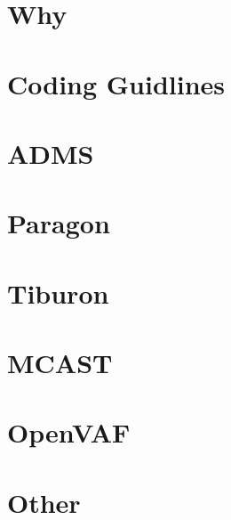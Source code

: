 \documentclass{article}[11pt]
\begin{document}
\notetitle

\section{Why}

\cite{kundert-automodcomp-02}
\cite{chalkiadaki-veriloga-13}


\section{Coding Guidlines}
\cite{fitzpatrick-veriloga-98}
\cite{coram-verilogamodel-04}
\cite{mcandrew-veriloga-15}

\section{ADMS}

\cite{lemaitre-adms-02}

\section{Paragon}
\cite{chaudhary-adms-04}

\section{Tiburon}

\cite{troyanovsky-veriloga-05}

\section{MCAST}

\cite{wan-mcast-03}
\cite{hu-mcast-05}
\cite{hu-modelautodiff-06}


\section{OpenVAF}

\cite{kuthe-verilogae-20}

\section{Other}

\cite{huszka-supressderiv-19}


\printbibliography
\end{document}
